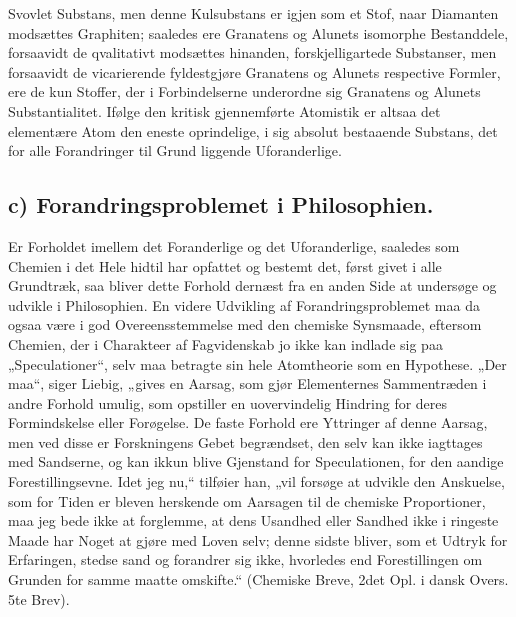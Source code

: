 \documentclass[12pt,a4paper]{book}
\begin{document}
Svovlet Substans, men denne Kulsubstans er igjen som et
Stof, naar Diamanten modsættes Graphiten; saaledes ere
Granatens og Alunets isomorphe Bestanddele, forsaavidt de
qvalitativt modsættes hinanden, forskjelligartede Substanser,
men forsaavidt de vicarierende fyldestgjøre Granatens og Alunets
respective Formler, ere de kun Stoffer, der i Forbindelserne
underordne sig Granatens og Alunets Substantialitet. Ifølge
den kritisk gjennemførte Atomistik er altsaa det elementære
Atom den eneste oprindelige, i sig absolut bestaaende
Substans, det for alle Forandringer til Grund liggende
Uforanderlige.
\subsection*{c) Forandringsproblemet i Philosophien.}

Er Forholdet imellem det Foranderlige og det Uforanderlige,
saaledes som Chemien i det Hele hidtil har opfattet og bestemt det,
først givet i alle Grundtræk, saa bliver dette Forhold dernæst
fra en anden Side at undersøge og udvikle i Philosophien.
En videre Udvikling af Forandringsproblemet maa da ogsaa
være i god Overeensstemmelse med den chemiske Synsmaade,
eftersom Chemien, der i Charakteer af Fagvidenskab jo ikke
kan indlade sig paa „Speculationer“, selv maa betragte sin
hele Atomtheorie som en Hypothese. „Der maa“, siger Liebig,
„gives en Aarsag, som gjør Elementernes Sammentræden i
andre Forhold umulig, som opstiller en uovervindelig
Hindring for deres Formindskelse eller Forøgelse. De faste
Forhold ere Yttringer af denne Aarsag, men ved disse er
Forskningens Gebet begrændset, den selv kan ikke iagttages med
Sandserne, og kan ikkun blive Gjenstand for Speculationen,
for den aandige Forestillingsevne. Idet jeg nu,“ tilføier han,
„vil forsøge at udvikle den Anskuelse, som for Tiden er bleven
herskende om Aarsagen til de chemiske Proportioner, maa jeg
bede ikke at forglemme, at dens Usandhed eller Sandhed ikke
i ringeste Maade har Noget at gjøre med Loven selv; denne
sidste bliver, som et Udtryk for Erfaringen, stedse sand og
forandrer sig ikke, hvorledes end Forestillingen om Grunden
for samme maatte omskifte.“ (Chemiske Breve, 2det Opl. i
dansk Overs. 5te Brev).
\end{document}
